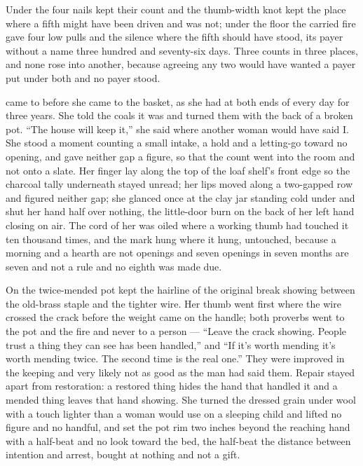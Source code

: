 Under  the four nails kept their count and the thumb-width knot kept the place where a fifth might have been driven and was not; under the floor the carried fire gave four low pulls and the silence where the fifth should have stood, its payer without a name three hundred and seventy-six days. Three counts in three places, and none rose into another, because agreeing any two would have wanted a payer put under both and no payer stood.

\scenebreak

 came to  before she came to the basket, as she had at both ends of every day for three years. She told the coals it was  and turned them with the back of a broken pot. “The house will keep it,” she said where another woman would have said I. She stood a moment counting a small intake, a hold and a letting-go toward no opening, and gave neither gap a figure, so that the count went into the room and not onto a slate. Her finger lay along the top of the loaf shelf's front edge so the charcoal tally underneath stayed unread; her lips moved along a two-gapped row and figured neither gap; she glanced once at the clay jar standing cold under  and shut her hand half over nothing, the little-door burn on the back of her left hand closing on air. The cord of her  was oiled where a working thumb had touched it ten thousand times, and the mark hung where it hung, untouched, because a morning and a hearth are not openings and seven openings in seven months are seven and not a rule and no eighth was made due.

On  the twice-mended pot kept the hairline of the original break showing between the old-brass staple and the tighter wire. Her thumb went first where the wire crossed the crack before the weight came on the handle; both proverbs went to the pot and the fire and never to a person — “Leave the crack showing. People trust a thing they can see has been handled,” and “If it's worth mending it's worth mending twice. The second time is the real one.” They were improved in the keeping and very likely not as good as the man had said them. Repair stayed apart from restoration: a restored thing hides the hand that handled it and a mended thing leaves that hand showing. She turned the dressed grain under wool with a touch lighter than a woman would use on a sleeping child and lifted no figure and no handful, and set the pot rim two inches beyond the reaching hand with a half-beat and no look toward the bed, the half-beat the distance between intention and arrest, bought at nothing and not a gift.

